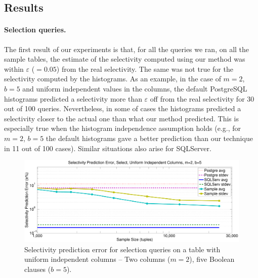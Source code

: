 \subsection{Results}
\paragraph{Selection queries.} The first result of our experiments is that, for
all the queries we ran, on all the sample tables, the estimate of the
selectivity computed using our method was within
$\varepsilon$ ($=0.05$) from the real selectivity. The same was not true for the
selectivity computed by the histograms. As an example, in the case of $m=2$,
$b=5$ and uniform independent values in the columns, the default PostgreSQL
histograms predicted a selectivity more than $\varepsilon$ off from the real
selectivity for 30 out of 100 queries.  Nevertheless, in some of cases the
histograms predicted a selectivity closer to the actual one than what our method
predicted. This is especially true when the histogram independence assumption
holds (e.g., for $m=2$, $b=5$ the default histograms gave a better prediction
than our technique in 11 out of 100 cases). Similar situations also arise for
SQLServer.

\begin{figure}[htbp]
  \centering
  \includegraphics[scale=0.30]{vcfreq/T_k5_u200k_unif_k2_b5_errperc}
  \caption{Selectivity prediction error for selection queries on a table with
  uniform independent columns -- Two columns ($m=2$), five Boolean clauses ($b=5$).}
  \label{fig:vcfreqT_k5_u200k_unif_k2_b5_errperc}
\end{figure}


